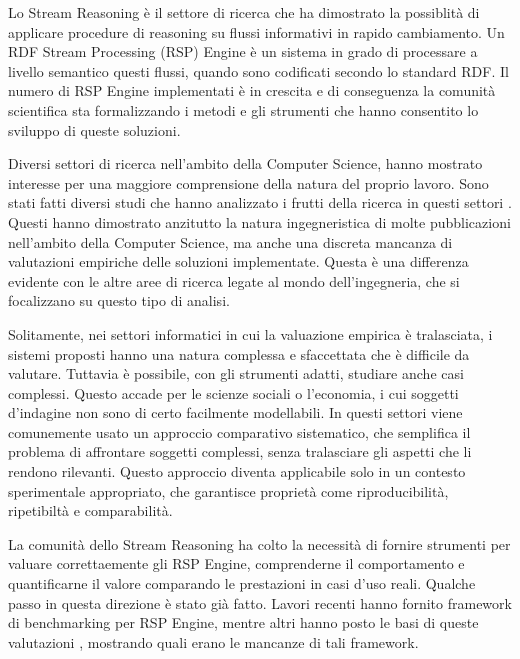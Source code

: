 Lo Stream Reasoning \`e  il settore di ricerca che ha dimostrato la possiblit\`a di applicare procedure di reasoning su flussi informativi in rapido cambiamento. Un RDF Stream Processing (RSP) Engine \`e  un sistema in grado di processare a livello semantico questi flussi, quando sono codificati secondo lo standard RDF. Il numero di RSP Engine implementati \`e  in crescita e di conseguenza la comunit\`a scientifica sta formalizzando i metodi e gli strumenti che hanno consentito lo sviluppo di queste soluzioni.

Diversi settori di ricerca nell'ambito della Computer Science, hanno mostrato interesse per una maggiore comprensione della natura del proprio lavoro. Sono stati fatti diversi studi che hanno analizzato i frutti della ricerca in questi settori \cite{Tichy:1995:EEC:209090.209093, Wainer:2009:EEC:1518331.1518552}. Questi hanno dimostrato anzitutto la natura ingegneristica di molte pubblicazioni nell'ambito della Computer Science, ma anche una discreta mancanza di valutazioni empiriche delle soluzioni implementate. Questa \`e  una differenza evidente con le altre aree di ricerca legate al mondo dell'ingegneria, che si focalizzano su questo tipo di analisi.

Solitamente, nei settori informatici in cui la valuazione empirica \`e tralasciata, i sistemi proposti hanno una natura complessa e sfaccettata che \`e difficile da valutare. Tuttavia \`e  possibile, con gli strumenti adatti, studiare anche casi complessi. Questo accade per le scienze sociali o l'economia, i cui soggetti d'indagine non sono di certo facilmente modellabili. In questi settori viene comunemente usato un approccio comparativo sistematico, che semplifica il problema di affrontare soggetti complessi, senza tralasciare gli aspetti che li rendono rilevanti. Questo approccio diventa applicabile solo in un contesto sperimentale appropriato, che garantisce propriet\`a come riproducibilit\`a, ripetibilt\`a e comparabilit\`a.

La comunit\`a dello Stream Reasoning ha colto la necessit\`a di fornire strumenti per valuare correttaemente gli RSP Engine,  comprenderne il comportamento e quantificarne il valore comparando le prestazioni in casi d'uso reali. Qualche passo in questa direzione \`e  stato gi\`a fatto. Lavori recenti \cite{Zhang2012, LePhuoc2012c, DBLP:conf/semweb/DellAglioCBCV13} hanno fornito framework di benchmarking per RSP Engine, mentre altri hanno posto le basi di queste valutazioni \cite{DBLP:conf/esws/ScharrenbachUMVB13}, mostrando quali erano le mancanze di tali framework.

